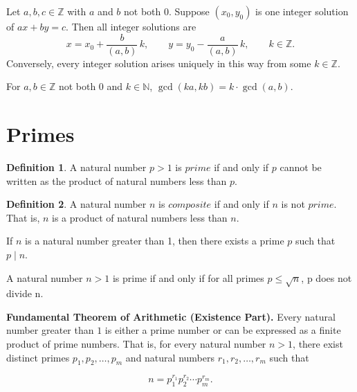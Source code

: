 \documentclass{article}
\theoremstyle{definition}
\newtheorem*{definition*}{Definition}
\newenvironment{manualtheorem}[1]{%
  \renewcommand{\thetheorem}{#1}%
  \theorem%
}{%
  \endtheorem%
}
\begin{document}
\begin{manualtheorem}{1.53}
	Let $a,b,c \in \mathbb{Z}$ with $a$ and $b$ not both $0$. Suppose $(x_0,y_0)$ is one integer solution of $ax+by=c$. Then all integer solutions are
	\[
		x = x_0 + \frac{b}{(a,b)}\,k,\qquad
		y = y_0 - \frac{a}{(a,b)}\,k,\qquad k \in \mathbb{Z}.
	\]
	Conversely, every integer solution arises uniquely in this way from some $k \in \mathbb{Z}$.
\end{manualtheorem}

\begin{manualtheorem}{1.55}
	For $a,b \in \mathbb{Z}$ not both $0$ and $k \in \mathbb{N}$, \quad $\gcd(ka,kb)=k\cdot \gcd(a,b)$.
\end{manualtheorem}



\pagebreak

\section{Primes}
\begin{definition*}
	A natural number $p > 1$ is $prime$ if and only if $p$ cannot be written as
	the product of natural numbers less than $p$.
\end{definition*}

\begin{definition*}
	A natural number $n$ is $composite$ if and only if $n$ is not $prime$. That is,
	$n$ is a product of natural numbers less than $n$.
\end{definition*}

\begin{manualtheorem}{2.1}
	If $n$ is a natural number greater than 1, then there exists a prime $p$
	such that $p \mid n$.
\end{manualtheorem}

\begin{manualtheorem}{2.3}
	A natural number $n > 1$ is prime if and only if for all primes $p \leq \sqrt{n}$,
	p does not divide n.
\end{manualtheorem}

\begin{manualtheorem}{2.7}
	\textbf{Fundamental Theorem of Arithmetic (Existence Part).}
	Every natural number greater than $1$ is either a prime number or can be expressed as a finite product of prime numbers.
	That is, for every natural number $n > 1$, there exist distinct primes $p_1, p_2, \ldots, p_m$ and natural numbers $r_1, r_2, \ldots, r_m$ such that

	\[
		n = p_1^{r_1} p_2^{r_2} \cdots p_m^{r_m}.
	\]
\end{manualtheorem}
\end{document}

